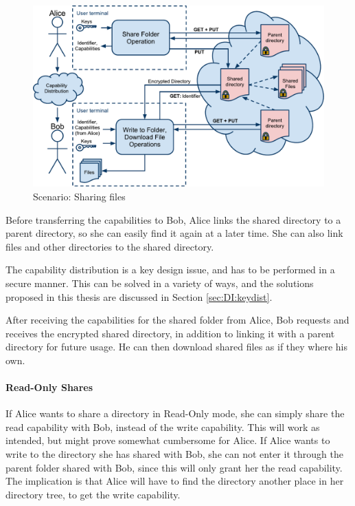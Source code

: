\documentclass[pdftex,english,10pt,b5paper,twoside]{book}
\begin{document}
\begin{figure}[h!]
    \centering
    \includegraphics[width=\columnwidth]{ArchitectureShare.pdf}
    \caption{Scenario: Sharing files}
    \label{fig:AS:sharing}
\end{figure}

Before transferring the capabilities to Bob, Alice links the shared directory
to a parent directory, so she can easily find it again at a later time. She can
also link files and other directories to the shared directory.

The capability distribution is a key design issue, and has to be performed in a
secure manner. This can be solved in a variety of ways, and the solutions
proposed in this thesis are discussed in Section \ref{sec:DI:keydist}.

After receiving the capabilities for the shared folder from Alice, Bob requests
and receives the encrypted shared directory, in addition to linking it with a
parent directory for future usage. He can then download shared files as if they
where his own.

\paragraph{Read-Only Shares}

If Alice wants to share a directory in Read-Only mode, she can simply share the
read capability with Bob, instead of the write capability. This will work as
intended, but might prove somewhat cumbersome for Alice. If Alice wants to
write to the directory she has shared with Bob, she can not enter it through
the parent folder shared with Bob, since this will only grant her the read
capability. The implication is that Alice will have to find the directory
another place in her directory tree, to get the write capability.
\end{document}
